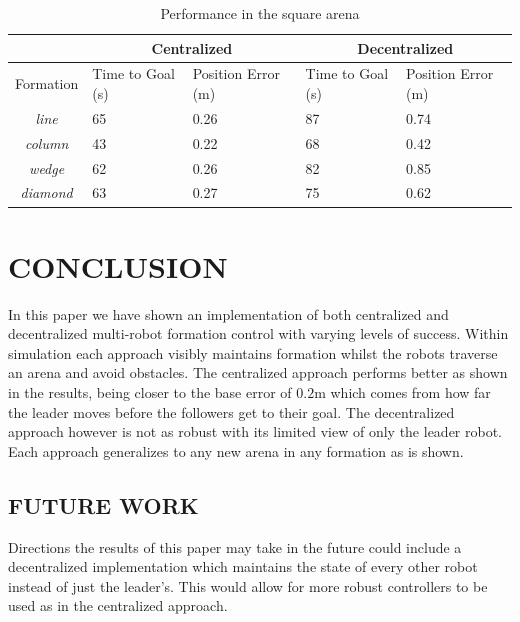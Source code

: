 \documentclass[letterpaper, 10 pt, conference]{ieeeconf}  %
\begin{document}
\begin{table}[tb]
\begin{tabular}{|c|p{1cm}p{1.2cm}|p{1cm}p{1.2cm}|}
\hline
 & \multicolumn{2}{|c|}{Centralized} & \multicolumn{2}{|c|}{Decentralized} \\
\hline
Formation & Time to Goal (s) & Position Error (m) & Time to Goal (s) & Position Error (m) \\
\hline
\textit{line}        & 65                     & 0.26               & 87                     & 0.74 \\
\textit{column}   & 43                     & 0.22               & 68                     & 0.42 \\
\textit{wedge}    & 62                     & 0.26               & 82                     & 0.85 \\
\textit{diamond} & 63                     & 0.27               & 75                     & 0.62 \\
\hline
\end{tabular}
\caption{Performance in the square arena}
\label{tab:results_square}
\end{table}

\section{CONCLUSION}

In this paper we have shown an implementation of both centralized and decentralized multi-robot formation control with varying levels of success. Within simulation each approach visibly maintains formation whilst the robots traverse an arena and avoid obstacles. The centralized approach performs better as shown in the results, being closer to the base error of $0.2$m which comes from how far the leader moves before the followers get to their goal. The decentralized approach however is not as robust with its limited view of only the leader robot. Each approach generalizes to any new arena in any formation as is shown.

\subsection{FUTURE WORK}

Directions the results of this paper may take in the future could include a decentralized implementation which maintains the state of every other robot instead of just the leader's. This would allow for more robust controllers to be used as in the centralized approach.
\end{document}
